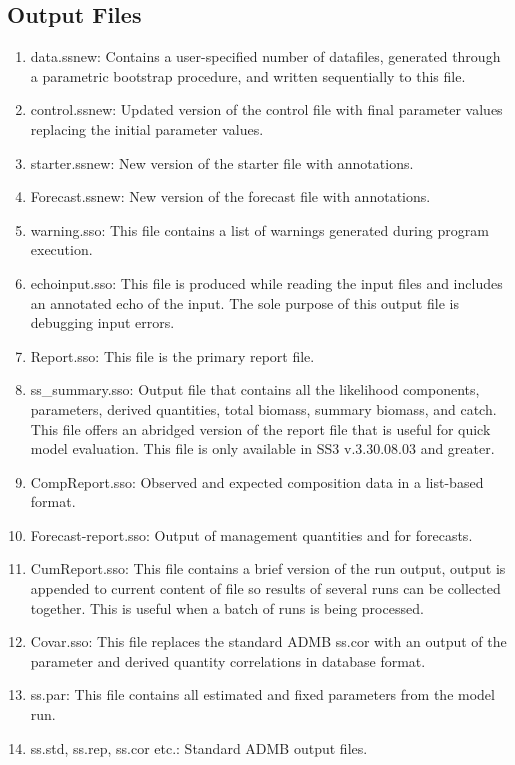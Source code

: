 	\subsection{Output Files}
	\begin{enumerate}
		\item data.ss\textunderscore new: Contains a user-specified number of datafiles, generated through a parametric bootstrap procedure, and written sequentially to this file.
		\item control.ss\textunderscore new: Updated version of the control file with final parameter values replacing the initial parameter values.
		\item starter.ss\textunderscore new: New version of the starter file with annotations.
		\item Forecast.ss\textunderscore new: New version of the forecast file with annotations.
		\item warning.sso: This file contains a list of warnings generated during program execution.
		\item echoinput.sso: This file is produced while reading the input files and includes an annotated echo of the input. The sole purpose of this output file is debugging input errors.
		\item Report.sso: This file is the primary report file.
		\item ss\_summary.sso: Output file that contains all the likelihood components, parameters, derived quantities, total biomass, summary biomass, and catch. This file offers an abridged version of the report file that is useful for quick model evaluation. This file is only available in SS3 v.3.30.08.03 and greater.
		\item CompReport.sso: Observed and expected composition data in a list-based format.
		\item Forecast-report.sso: Output of management quantities and for forecasts.
		\item CumReport.sso: This file contains a brief version of the run output, output is appended to current content of file so results of several runs can be collected together.  This is useful when a batch of runs is being processed.
		\item Covar.sso: This file replaces the standard ADMB ss.cor with an output of the parameter and derived quantity correlations in database format.
		\item ss.par: This file contains all estimated and fixed parameters from the model run. 
		\item ss.std, ss.rep, ss.cor etc.:  Standard ADMB output files.

\end{enumerate}
